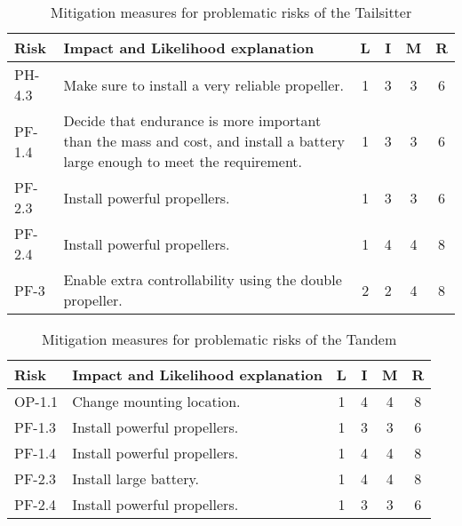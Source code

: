 \begin{table}[H]
    \centering
    \caption{Mitigation measures for problematic risks of the Tailsitter}
    \label{tab:miti_tail}
    \begin{tabularx}{\textwidth}{l L *{4}{c}}
    \toprule
    Risk            & Impact and Likelihood explanation             &       L   & I & M & R           
    \\ \midrule
    PH-4.3          & Make sure to install a very reliable propeller.  &    1   & 3 & 3 & 6
    \\ \hdashline
    PF-1.4          & Decide that endurance is more important than the mass and cost, and install a battery large enough to meet the requirement.                         & 1 & 3 & 3 & 6
    \\ \hdashline
    PF-2.3          & Install powerful propellers.                       &   1   & 3 & 3 & 6                           
    \\ \hdashline
    PF-2.4          & Install powerful propellers.                       &   1   & 4 & 4 & 8
    \\ \hdashline
    PF-3            & Enable extra controllability using the double propeller.   & 2 & 2 & 4 & 8
    \\ \bottomrule
    \end{tabularx}
\end{table}



\begin{table}[H]
    \centering
    \caption{Mitigation measures for problematic risks of the Tandem}
    \label{tab:miti_tand}
    \begin{tabularx}{\textwidth}{l L *{4}{c}}
    \toprule
    Risk            & Impact and Likelihood explanation                                     & L & I & M & R
    \\ \midrule
    OP-1.1          & Change mounting location.                                             & 1 & 4 & 4 & 8
    \\ \hdashline
    PF-1.3          & Install powerful propellers.                                      &   1   & 3 & 3 & 6 
    \\ \hdashline
    PF-1.4          & Install powerful propellers.                                      &   1   & 4 & 4 & 8 
    \\ \hdashline
    PF-2.3 & Install large battery.                                            &   1   & 4 & 4 & 8 
    \\ \hdashline
    PF-2.4          & Install powerful propellers.                                      &   1   & 3 & 3 & 6 
    \\ \bottomrule
    \end{tabularx}
\end{table}


